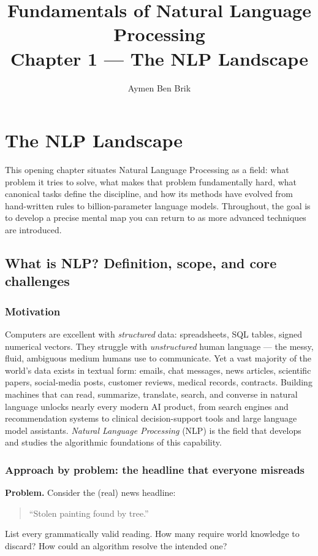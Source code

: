 \documentclass[12pt,a4paper]{report}
\title{Fundamentals of Natural Language Processing\\[0.3cm] \large Chapter 1 --- The NLP Landscape}
\author{Aymen Ben Brik}
\date{}
\theoremstyle{definition}
\theoremstyle{remark}
\begin{document}
\maketitle

\chapter{The NLP Landscape}

This opening chapter situates Natural Language Processing as a field: what problem it tries to solve, what makes that problem fundamentally hard, what canonical tasks define the discipline, and how its methods have evolved from hand-written rules to billion-parameter language models. Throughout, the goal is to develop a precise mental map you can return to as more advanced techniques are introduced.

\section{What is NLP? Definition, scope, and core challenges}

\subsection{Motivation}
Computers are excellent with \emph{structured} data: spreadsheets, SQL tables, signed numerical vectors. They struggle with \emph{unstructured} human language --- the messy, fluid, ambiguous medium humans use to communicate. Yet a vast majority of the world's data exists in textual form: emails, chat messages, news articles, scientific papers, social-media posts, customer reviews, medical records, contracts. Building machines that can read, summarize, translate, search, and converse in natural language unlocks nearly every modern AI product, from search engines and recommendation systems to clinical decision-support tools and large language model assistants. \emph{Natural Language Processing} (NLP) is the field that develops and studies the algorithmic foundations of this capability.

\subsection{Approach by problem: the headline that everyone misreads}
\textbf{Problem.} Consider the (real) news headline:
\begin{quote}
``Stolen painting found by tree.''
\end{quote}
List every grammatically valid reading. How many require world knowledge to discard? How could an algorithm resolve the intended one?
\end{document}
